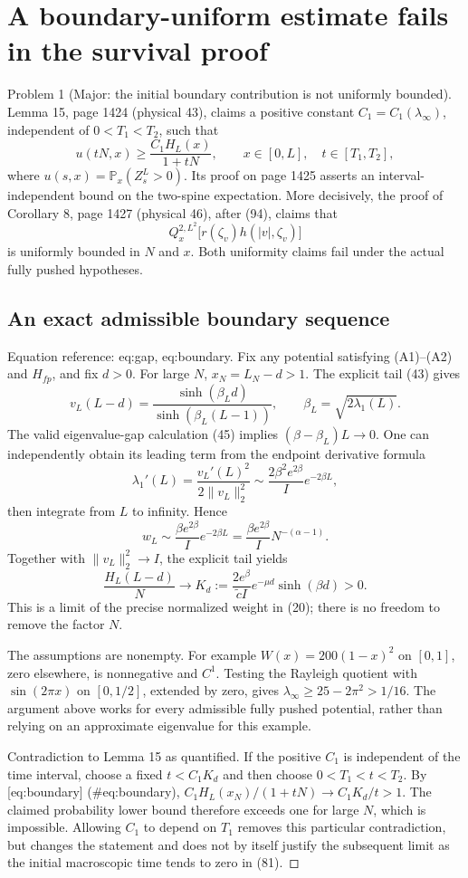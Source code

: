 \documentclass[10pt]{article}
\begin{document}
\section*{A boundary-uniform estimate fails in the survival proof}
Problem 1 (Major: the initial boundary contribution is not uniformly bounded).  Lemma 15, page 1424 (physical 43), claims a positive constant \(C_1=C_1(\lambda_\infty)\), independent of \(0<T_1<T_2\), such that \[u(tN,x)\geq \frac{C_1H_L(x)}{1+tN},
 \qquad x\in[0,L],\quad t\in[T_1,T_2],\] where \(u(s,x)=\mathbb P_x(Z_s^L>0)\). Its proof on page 1425 asserts an interval-independent bound on the two-spine expectation. More decisively, the proof of Corollary 8, page 1427 (physical 46), after (94), claims that \[Q_x^{2,L^2}\big[r(\zeta_v)h(|v|,\zeta_v)\big]\] is uniformly bounded in \(N\) and \(x\). Both uniformity claims fail under the actual fully pushed hypotheses.\par
\subsection*{An exact admissible boundary sequence}
Equation reference: eq:gap, eq:boundary. Fix any potential satisfying (A1)–(A2) and \(H_{fp}\), and fix \(d>0\). For large \(N\), \(x_N=L_N-d>1\). The explicit tail (43) gives \[v_L(L-d)=\frac{\sinh(\beta_Ld)}
                   {\sinh(\beta_L(L-1))},
 \qquad \beta_L=\sqrt{2\lambda_1(L)}.\] The valid eigenvalue-gap calculation (45) implies \((\beta-\beta_L)L\to0\). One can independently obtain its leading term from the endpoint derivative formula \[\lambda_1'(L)=\frac{v_L'(L)^2}{2\|v_L\|_2^2}
 \sim\frac{2\beta^2e^{2\beta}}{I}e^{-2\beta L},\] then integrate from \(L\) to infinity. Hence \[
 w_L\sim \frac{\beta e^{2\beta}}{I}e^{-2\beta L}
       =\frac{\beta e^{2\beta}}{I}N^{-(\alpha-1)}.\] Together with \(\|v_L\|_2^2\to I\), the explicit tail yields \[
 \frac{H_L(L-d)}{N}
 \longrightarrow
 K_d:=\frac{2e^\beta}{\widetilde c I}
          e^{-\mu d}\sinh(\beta d)>0 .\] This is a limit of the precise normalized weight in (20); there is no freedom to remove the factor \(N\).\par
The assumptions are nonempty. For example \(W(x)=200(1-x)^2\) on \([0,1]\), zero elsewhere, is nonnegative and \(C^1\). Testing the Rayleigh quotient with \(\sin(2\pi x)\) on \([0,1/2]\), extended by zero, gives \(\lambda_\infty\geq25-2\pi^2>1/16\). The argument above works for every admissible fully pushed potential, rather than relying on an approximate eigenvalue for this example.\par
Contradiction to Lemma 15 as quantified. If the positive \(C_1\) is independent of the time interval, choose a fixed \(t<C_1K_d\) and then choose \(0<T_1<t<T_2\). By [eq:boundary] (\#eq:boundary), \(C_1H_L(x_N)/(1+tN)\to C_1K_d/t>1\). The claimed probability lower bound therefore exceeds one for large \(N\), which is impossible. Allowing \(C_1\) to depend on \(T_1\) removes this particular contradiction, but changes the statement and does not by itself justify the subsequent limit as the initial macroscopic time tends to zero in (81). ◻\par
\end{document}
